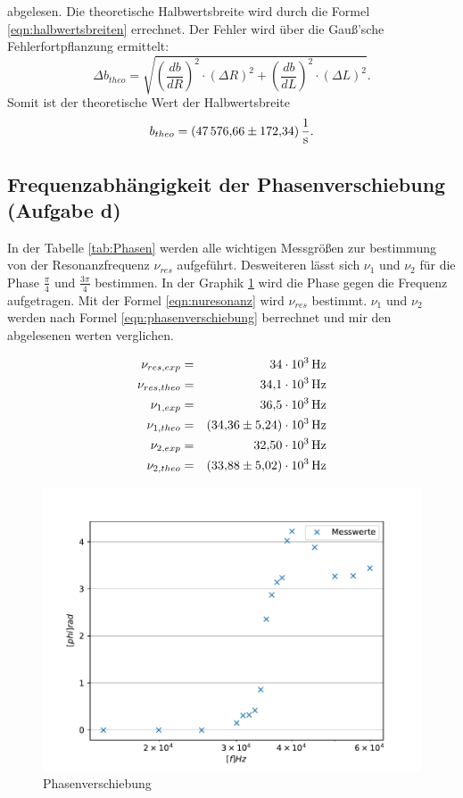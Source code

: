 abgelesen.
Die theoretische Halbwertsbreite wird durch die Formel \eqref{eqn:halbwertsbreiten} errechnet.
Der Fehler wird über die Gauß'sche Fehlerfortpflanzung ermittelt:
\begin{equation*}
  \Delta b_{theo} = \sqrt{ \left( \frac{db}{dR} \right)^2 \cdot (\Delta R)^2 + \left( \frac{db}{dL} \right)^2 \cdot (\Delta L)^2}.
\end{equation*}
Somit ist der theoretische Wert der Halbwertsbreite
\begin{equation*}
  b_{theo}= \SI{47576.66 \pm 172.34}{\frac{1}{s}}.
\end{equation*}
\FloatBarrier


\subsection{Frequenzabhängigkeit der Phasenverschiebung (Aufgabe d)}
In der Tabelle \ref{tab:Phasen} werden alle wichtigen Messgrößen zur bestimmung von der Resonanzfrequenz $\nu_{res}$ aufgeführt. Desweiteren lässt sich $\nu_1$ und $\nu_2$ für die Phase $\frac {\pi}{4}$ und $\frac{3\pi}{4}$ bestimmen.
In der Graphik \ref{fig:Phasen} wird die Phase gegen die Frequenz aufgetragen.
Mit der Formel \eqref{eqn:nuresonanz} wird $\nu_{res}$ bestimmt. $\nu_1$ und $\nu_{2}$ werden nach Formel \eqref{eqn:phasenverschiebung} berrechnet und mir den abgelesenen werten verglichen.

\begin{align*}
  \nu_{res, exp}  &=& \SI{34e03}{Hz}\\
  \nu_{res, theo} &=& \SI{34,1e03}{Hz}\\
  \nu_{1, exp}    &=& \SI{36,5e03}{Hz}\\
  \nu_{1, theo}   &=& \SI{34,36\pm5,24e03}{Hz}\\
  \nu_{2, exp}    &=& \SI{32,50e03}{Hz}\\
  \nu_{2, theo}   &=& \SI{33,88\pm5,02e03}{Hz}\\
\end{align*}


\begin{figure}[h!]
  \centering
  \includegraphics[width=\textwidth]{Phasschib.pdf}
  \caption{Phasenverschiebung}
  \label{fig:Phasen}
\end{figure}
\FloatBarrier
